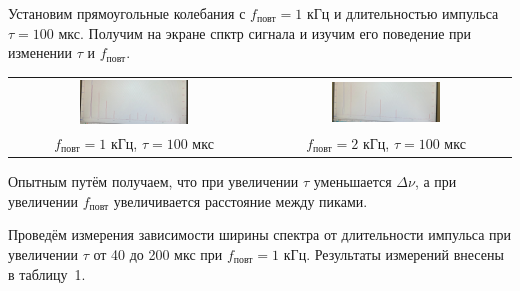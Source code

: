 \documentclass[a4paper]{article}
\theoremstyle{definition}
\theoremstyle{remark}
\begin{document}
Установим прямоугольные колебания с $f_{\text{повт}} = 1$ кГц и длительностью импульса \\ $\tau =100$ мкс. Получим на экране спктр сигнала и изучим его поведение при изменении $\tau$ и $f_{\text{повт}}$. 


    \begin{center}
        \begin{tabular}{cc}
        \includegraphics[width=0.45\textwidth]{image/pic1.JPG}&\includegraphics[width=0.45\textwidth]{image/pic2.JPG}\\
        $f_{\text{повт}} = 1$ кГц, $\tau = 100$ мкс & 
        $f_{\text{повт}} = 2$ кГц, $\tau = 100$ мкс\\
        \end{tabular}
        \end{center}

\noindent Опытным путём получаем, что при увеличении $\tau$ уменьшается $\Delta\nu$, а при увеличении $f_{\text{повт}}$ увеличивается расстояние между пиками. 

\medskip

\noindent Проведём измерения зависимости ширины спектра от длительности импульса при увеличении $\tau$ от 40 до 200 мкс при $f_{\text{повт}} = 1$ кГц. Результаты измерений внесены в таблицу~1.
\end{document}
